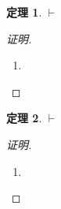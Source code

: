 \documentclass{article}
\newtheorem{Thm}{定理}
\begin{document}
\begin{CJK*}{UTF8}{gbsn}
  \begin{Thm}$\vdash$\end{Thm}
  \begin{proof}[证明]$\quad$
    \begin{enumerate}
      \item 
    \end{enumerate}
  \end{proof}

  \begin{Thm}$\vdash$\end{Thm}
  \begin{proof}[证明]$\quad$
    \begin{enumerate}
      \item 
    \end{enumerate}
  \end{proof}
\end{CJK*}
\end{document}
